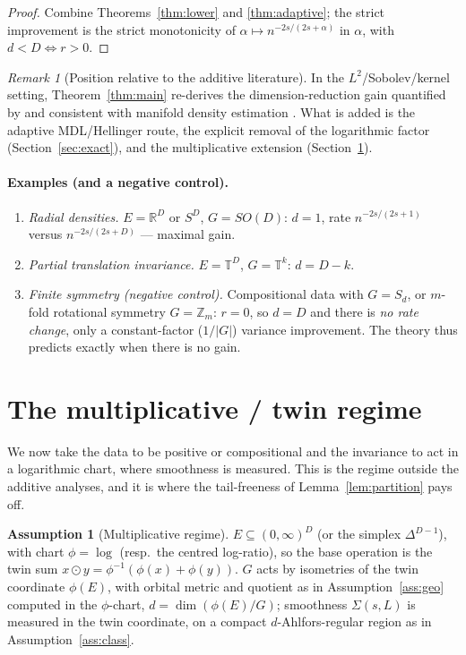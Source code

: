 \documentclass[11pt]{article}
\theoremstyle{plain}
\theoremstyle{definition}
\newtheorem{assumption}{Assumption}
\theoremstyle{remark}
\newtheorem{remark}[theorem]{Remark}
\newcommand{\R}{\mathbb{R}}
\newcommand{\T}{\mathbb{T}}
\DeclareMathOperator{\dimm}{dim}
\begin{document}
\begin{proof}
Combine Theorems~\ref{thm:lower} and \ref{thm:adaptive}; the strict improvement is
the strict monotonicity of $\alpha\mapsto n^{-2s/(2s+\alpha)}$ in $\alpha$, with
$d<D\iff r>0$.
\end{proof}

\begin{remark}[Position relative to the additive literature]
In the $L^2$/Sobolev/kernel setting, Theorem~\ref{thm:main} re-derives the
dimension-reduction gain quantified by \cite{tahmasebi2023,elesedy2021,bietti2021}
and consistent with manifold density estimation \cite{hendriks1990,pelletier2005}.
What is added is the adaptive MDL/Hellinger route, the explicit removal of the
logarithmic factor (Section~\ref{sec:exact}), and the multiplicative extension
(Section~\ref{sec:mult}).
\end{remark}

\paragraph{Examples (and a negative control).}
\begin{enumerate}[label=(\alph*),leftmargin=1.8em]
\item \emph{Radial densities.} $E=\R^D$ or $S^D$, $G=SO(D)$: $d=1$, rate
$n^{-2s/(2s+1)}$ versus $n^{-2s/(2s+D)}$ --- maximal gain.
\item \emph{Partial translation invariance.} $E=\T^D$, $G=\T^k$: $d=D-k$.
\item \emph{Finite symmetry (negative control).} Compositional data with $G=S_d$,
or $m$-fold rotational symmetry $G=\mathbb Z_m$: $r=0$, so $d=D$ and there is
\emph{no rate change}, only a constant-factor ($1/|G|$) variance improvement. The
theory thus predicts exactly when there is no gain.
\end{enumerate}

\section{The multiplicative / twin regime}\label{sec:mult}

We now take the data to be positive or compositional and the invariance to act in a
logarithmic chart, where smoothness is measured. This is the regime outside the
additive analyses, and it is where the tail-freeness of Lemma~\ref{lem:partition}
pays off.

\begin{assumption}[Multiplicative regime]\label{ass:mult}
$E\subseteq(0,\infty)^D$ (or the simplex $\Delta^{D-1}$), with chart $\phi=\log$
(resp.\ the centred log-ratio), so the base operation is the twin sum
$x\odot y=\phi^{-1}(\phi(x)+\phi(y))$. $G$ acts by isometries of the twin
coordinate $\phi(E)$, with orbital metric and quotient as in
Assumption~\ref{ass:geo} computed in the $\phi$-chart, $d=\dimm(\phi(E)/G)$;
smoothness $\Sigma(s,L)$ is measured in the twin coordinate, on a compact
$d$-Ahlfors-regular region as in Assumption~\ref{ass:class}.
\end{assumption}
\end{document}
